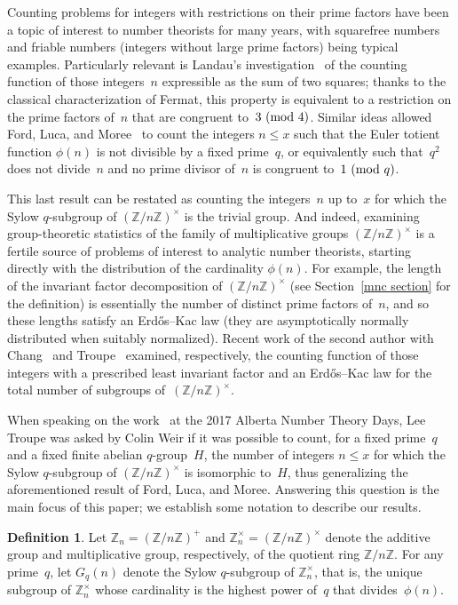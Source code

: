 \documentclass[12pt,reqno]{amsart}
\theoremstyle{definition}
\newtheorem{definition}[theorem]{Definition}
\newcommand{\Z}{{\mathbb Z}}
\renewcommand{\mod}[1]{{\ifmmode\text{\rm\ (mod~$#1$)}\else\discretionary{}{}{\hbox{ }}\rm(mod~$#1$)\fi}}
\begin{document}
Counting problems for integers with restrictions on their prime factors have been a topic of interest to number theorists for many years, with squarefree numbers and friable numbers (integers without large prime factors) being typical examples. Particularly relevant is Landau's investigation~\cite{Landau} of the counting function of those integers~$n$ expressible as the sum of two squares; thanks to the classical characterization of Fermat, this property is equivalent to a restriction on the prime factors of~$n$ that are congruent to~$3\mod4$. Similar ideas allowed Ford, Luca, and Moree~\cite{FordLucaMoree} to count the integers $n\le x$ such that the Euler totient function $\phi(n)$ is not divisible by a fixed prime~$q$, or equivalently such that~$q^2$ does not divide~$n$ and no prime divisor of~$n$ is congruent to~$1\mod q$.  

This last result can be restated as counting the integers~$n$ up to~$x$ for which the Sylow $q$-subgroup of $(\Z/n\Z)^\times$ is the trivial group. And indeed, examining group-theoretic statistics of the family of multiplicative groups $(\Z/n\Z)^\times$ is a fertile source of problems of interest to analytic number theorists, starting directly with the distribution of the cardinality $\phi(n)$. For example, the length of the invariant factor decomposition of $(\Z/n\Z)^\times$ (see Section~\ref{mnc section} for the definition) is essentially the number of distinct prime factors of~$n$, and so these lengths satisfy an Erd\H os--Kac law (they are asymptotically normally distributed when suitably normalized). Recent work of the second author with Chang~\cite{CM} and Troupe~\cite{MartinTroupe} examined, respectively, the counting function of those integers with a prescribed least invariant factor and an Erd\H os--Kac law for the total number of subgroups of~$(\Z/n\Z)^\times$.

When speaking on the work~\cite{MartinTroupe} at the 2017 Alberta Number Theory Days, Lee Troupe was asked by Colin Weir if it was possible to count, for a fixed prime~$q$ and a fixed finite abelian $q$-group~$H$, the number of integers $n\le x$ for which the Sylow $q$-subgroup of $(\Z/n\Z)^\times$ is isomorphic to~$H$, thus generalizing the aforementioned result of Ford, Luca, and Moree. Answering this question is the main focus of this paper; we establish some notation to describe our results.

\begin{definition}
Let $\Z_n=(\Z/n\Z)^+$ and $\Z_n^\times=(\Z/n\Z)^\times$ denote the additive group and multiplicative group, respectively, of the quotient ring $\Z/n\Z$. For any prime~$q$, let $G_q(n)$ denote the Sylow $q$-subgroup of $\Z_n^\times$, that is, the unique subgroup of $\Z_n^\times$ whose cardinality is the highest power of~$q$ that divides~$\phi(n)$.
\end{definition}
\end{document}
